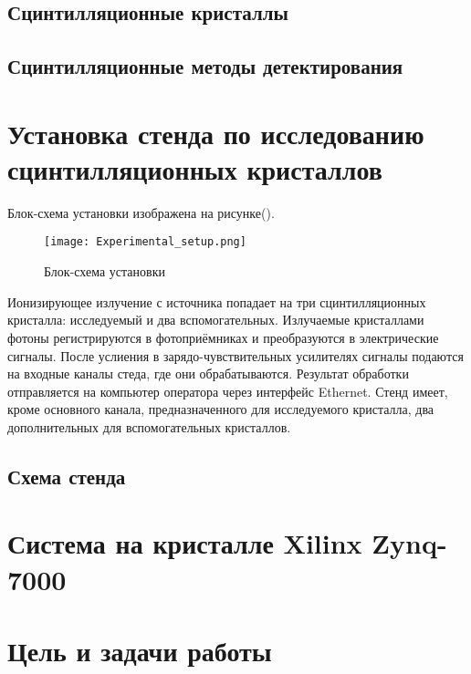 \documentclass[a4paper, 14pt]{extarticle}
\begin{document}
    \subsection{Сцинтилляционные кристаллы}
    
    \subsection{Сцинтилляционные методы детектирования}
    \newpage

\section{Установка стенда по исследованию сцинтилляционных кристаллов}
    Блок-схема установки изображена на рисунке().\par
    \begin{figure}[ht]
        \centering
        \texttt{[image: Experimental\_setup.png]}
        \caption{Блок-схема установки}
        \label{fig:mpr}
    \end{figure}
    Ионизирующее излучение с источника попадает на три сцинтилляционных кристалла: исследуемый и два вспомогательных. Излучаемые кристаллами фотоны регистрируются в фотоприёмниках и преобразуются в электрические сигналы. После услиения в зарядо-чувствительных усилителях сигналы подаются на входные каналы стеда, где они обрабатываются. Результат обработки отправляется на компьютер оператора через интерфейс Ethernet. Стенд имеет, кроме основного канала, предназначенного для исследуемого кристалла, два дополнительных для вспомогательных кристаллов.
    
    \subsection{Схема стенда}
    \newpage

\section{Система на кристалле Xilinx Zynq-7000}
    \newpage
    
\section{Цель и задачи работы}
    \newpage
    
\end{document}
